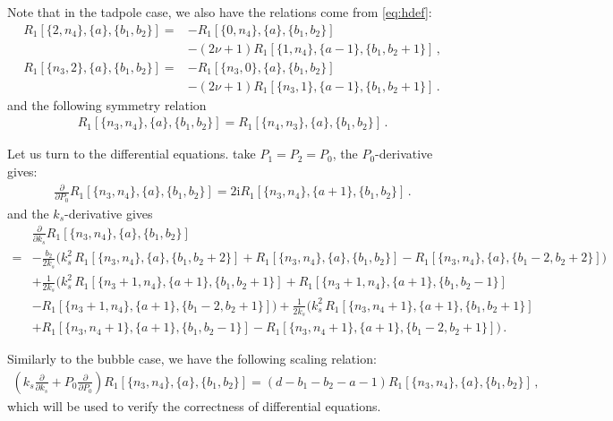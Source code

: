 \documentclass[%
 reprint,
 amsmath,amssymb,
 aps,
prd,
]{revtex4-2}
\newcommand{\n}{\nonumber}
\def\ii{\mathrm{i}}
\begin{document}
\begin{widetext}
Note that in the tadpole case, we also have the relations come from \eqref{eq:hdef}:
\begin{align}
	R_1[\{2,n_4\},\{a\},\{b_1,b_2\}] = & - R_1[\{0,n_4\},\{a\},\{b_1,b_2\}] \nonumber                            \\
 & - (2\nu+1) R_1[\{1,n_4\},\{a-1\},\{b_1,b_2+1\}]\,, \label{eq:R1eom1} \\
	R_1[\{n_3,2\},\{a\},\{b_1,b_2\}] = & - R_1[\{n_3,0\},\{a\},\{b_1,b_2\}] \nonumber                            \\
& - (2\nu+1) R_1[\{n_3,1\},\{a-1\},\{b_1,b_2+1\}]\,. \label{eq:R1eom2}
\end{align}
and the following symmetry relation
\begin{align}
	 R_1[\{n_3,n_4\},\{a\},\{b_1,b_2\}] = R_1[\{n_4,n_3\},\{a\},\{b_1,b_2\}] \label{eq:R1sym}\,. 
\end{align}

Let us turn to the differential equations. take $P_1=P_2=P_0$, the $P_0$-derivative gives:
\begin{align}
	\frac{\partial}{\partial P_0} R_1[\{n_3,n_4\},\{a\},\{b_1,b_2\}] = 2 \ii R_1[\{n_3,n_4\},\{a+1\},\{b_1,b_2\}]\,. \label{eq:R1dP0}
\end{align}
and the $k_s$-derivative gives
\begin{align}
	&\frac{\partial}{\partial k_s} R_1[\{n_3,n_4\},\{a\},\{b_1,b_2\}] \n\\
	=&-\frac{b_2}{2k_s}\Big(
	k_s^2\,R_1[\{n_3,n_4\},\{a\},\{b_1,b_2+2\}] 
	+R_1[\{n_3,n_4\},\{a\},\{b_1,b_2\}] 
	-R_1[\{n_3,n_4\},\{a\},\{b_1-2,b_2+2\}]
	\Big) \nonumber\\
	&+\frac{1}{2k_s}\Big(
	k_s^2\,R_1[\{n_3+1,n_4\},\{a+1\},\{b_1,b_2+1\}] 
	+R_1[\{n_3+1,n_4\},\{a+1\},\{b_1,b_2-1\}] \nonumber\\
	&
	-R_1[\{n_3+1,n_4\},\{a+1\},\{b_1-2,b_2+1\}]
	\Big)+\frac{1}{2k_s}\Big(
	k_s^2\,R_1[\{n_3,n_4+1\},\{a+1\},\{b_1,b_2+1\}] 
	\nonumber\\
 &+R_1[\{n_3,n_4+1\},\{a+1\},\{b_1,b_2-1\}] 
	-R_1[\{n_3,n_4+1\},\{a+1\},\{b_1-2,b_2+1\}]
	\Big)\,. \label{eq:R1dks}
\end{align}

Similarly to the bubble case, we have the following scaling relation:
\begin{align}
	\left( k_s \frac{\partial}{\partial k_s} + P_0 \frac{\partial}{\partial P_0} \right) R_1[\{n_3,n_4\},\{a\},\{b_1,b_2\}] = (d - b_1 - b_2 - a - 1) R_1[\{n_3,n_4\},\{a\},\{b_1,b_2\}]\,, \label{eq:R1scaling}
\end{align}
which will be used to verify the correctness of differential equations.


\end{widetext}
\end{document}
